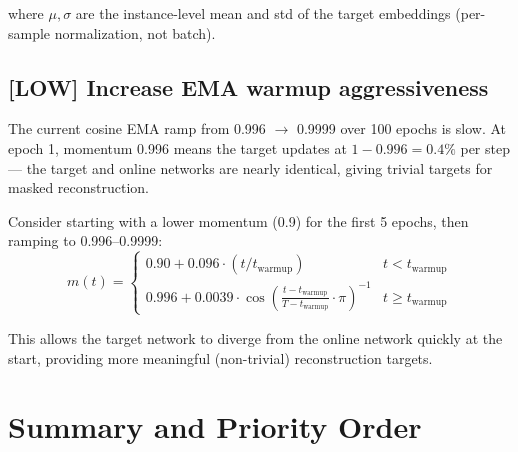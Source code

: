 \documentclass[11pt,a4paper]{article}
\newcommand{\low}[1]{\textcolor{impactlow}{\textbf{[LOW]} #1}}
\begin{document}
where $\mu, \sigma$ are the instance-level mean and std of the target embeddings
(per-sample normalization, not batch).

\subsection{\low{Increase EMA warmup aggressiveness}}

The current cosine EMA ramp from 0.996 $\to$ 0.9999 over 100 epochs is slow.
At epoch 1, momentum 0.996 means the target updates at $1 - 0.996 = 0.4\%$
per step --- the target and online networks are nearly identical, giving
trivial targets for masked reconstruction.

Consider starting with a lower momentum (0.9) for the first 5 epochs,
then ramping to 0.996--0.9999:
\[
    m(t) = \begin{cases}
    0.90 + 0.096 \cdot (t / t_{\text{warmup}}) & t < t_{\text{warmup}} \\
    0.996 + 0.0039 \cdot \cos\!\left(\frac{t - t_{\text{warmup}}}{T - t_{\text{warmup}}} \cdot \pi\right)^{-1} & t \geq t_{\text{warmup}}
    \end{cases}
\]

This allows the target network to diverge from the online network quickly
at the start, providing more meaningful (non-trivial) reconstruction targets.

\section{Summary and Priority Order}
\end{document}
